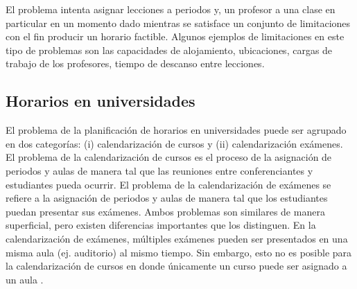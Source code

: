 \documentclass[draft,12pt,headsepline,footsepline,paper=letter]{scrreprt}
\begin{document}
El problema intenta asignar lecciones a periodos y, un profesor a una clase en particular en un momento dado mientras se satisface un conjunto de limitaciones con el fin producir un horario factible. Algunos ejemplos de limitaciones en este tipo de problemas son las capacidades de alojamiento, ubicaciones, cargas de trabajo de los profesores, tiempo de descanso entre lecciones.

\subsection{Horarios en universidades}

El problema de la planificación de horarios en universidades puede ser agrupado en dos categorías: (i) calendarización de cursos y (ii) calendarización exámenes. 
El problema de la calendarización de cursos es el proceso de la asignación de periodos y aulas de manera tal que las reuniones entre conferenciantes y estudiantes pueda ocurrir. 
El problema de la calendarización de exámenes se refiere a la asignación de periodos y aulas de manera tal que los estudiantes puedan presentar sus exámenes. 
Ambos problemas son similares de manera superficial, pero existen diferencias importantes que los distinguen. 
En la calendarización de exámenes, múltiples exámenes pueden ser presentados en una misma aula (ej. auditorio) al mismo tiempo. 
Sin embargo, esto no es posible para la calendarización de cursos en donde únicamente un curso puede ser asignado a un aula \citep[p.~11]{abdullah06heuristic-approaches}.
\end{document}
